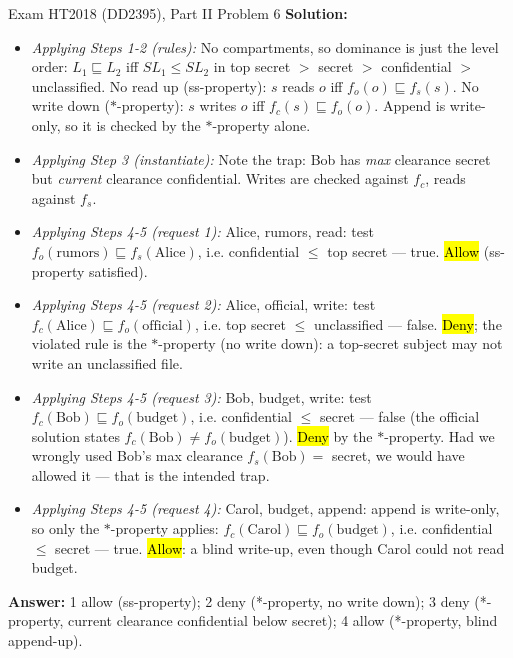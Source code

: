 \documentclass[12pt, a4paper]{article}
\newcommand{\imp}[1]{\hl{#1}}                       %
\begin{document}
\begin{practicebox}{Exam HT2018 (DD2395), Part II Problem 6}
\textbf{Solution:}
\begin{itemize}
    \item \textit{Applying Steps 1-2 (rules):} No compartments, so dominance is just the level order: $L_1 \sqsubseteq L_2$ iff $SL_1 \leq SL_2$ in top secret $>$ secret $>$ confidential $>$ unclassified. No read up (ss-property): $s$ reads $o$ iff $f_o(o) \sqsubseteq f_s(s)$. No write down ($*$-property): $s$ writes $o$ iff $f_c(s) \sqsubseteq f_o(o)$. Append is write-only, so it is checked by the $*$-property alone.
    \item \textit{Applying Step 3 (instantiate):} Note the trap: Bob has \emph{max} clearance secret but \emph{current} clearance confidential. Writes are checked against $f_c$, reads against $f_s$.
    \item \textit{Applying Steps 4-5 (request 1):} Alice, rumors, read: test $f_o(\text{rumors}) \sqsubseteq f_s(\text{Alice})$, i.e. confidential $\leq$ top secret --- true. \imp{Allow} (ss-property satisfied).
    \item \textit{Applying Steps 4-5 (request 2):} Alice, official, write: test $f_c(\text{Alice}) \sqsubseteq f_o(\text{official})$, i.e. top secret $\leq$ unclassified --- false. \imp{Deny}; the violated rule is the $*$-property (no write down): a top-secret subject may not write an unclassified file.
    \item \textit{Applying Steps 4-5 (request 3):} Bob, budget, write: test $f_c(\text{Bob}) \sqsubseteq f_o(\text{budget})$, i.e. confidential $\leq$ secret --- false (the official solution states $f_c(\text{Bob}) \neq f_o(\text{budget})$). \imp{Deny} by the $*$-property. Had we wrongly used Bob's max clearance $f_s(\text{Bob}) = $ secret, we would have allowed it --- that is the intended trap.
    \item \textit{Applying Steps 4-5 (request 4):} Carol, budget, append: append is write-only, so only the $*$-property applies: $f_c(\text{Carol}) \sqsubseteq f_o(\text{budget})$, i.e. confidential $\leq$ secret --- true. \imp{Allow}: a blind write-up, even though Carol could not read budget.
\end{itemize}
\textbf{Answer:} 1 allow (ss-property); 2 deny (*-property, no write down); 3 deny (*-property, current clearance confidential below secret); 4 allow (*-property, blind append-up).
\end{practicebox}
\end{document}
